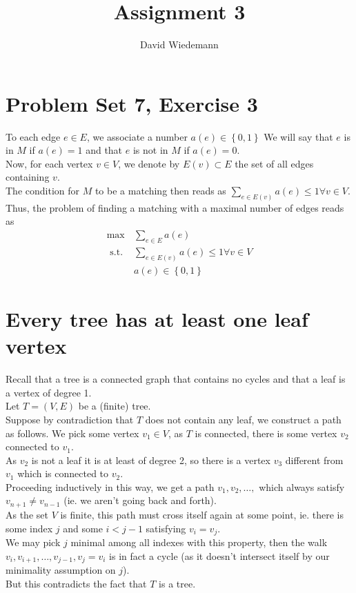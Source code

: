 \documentclass[11pt, a4paper]{article}
\begin{document}
\title{Assignment 3}
\author{David Wiedemann}
\maketitle
\section{Problem Set 7, Exercise 3}
To each edge $e\in E$, we associate a number $a( e ) \in \left\{ 0,1 \right\}  $ 
We will say that $e$ is in $M$ if $a( e ) =1$ and that $e$ is not in $M$ if $a( e  ) =0$.\\
Now, for each vertex $v\in V$, we denote by $E( v) \subset E$ the set of all edges containing $v$.\\
The condition for $M$ to be a matching then reads as $\sum_{ e \in E( v) } a( e )  \leq 1\forall  v \in V$.\\
Thus, the problem of finding a matching with a maximal number of edges reads as
\begin{align*}
	\max & \sum_{ e \in E} a( e  ) \\
	\text{ s.t. } & \sum_{e \in E( v) } a( e ) \leq 1\forall v \in V\\
		      &a( e  ) \in \left\{ 0,1 \right\} 
\end{align*}
\section{Every tree has at least one leaf vertex}
Recall that a tree is a connected graph that contains no cycles and that a leaf is a vertex of degree 1.\\
Let $T= ( V,E) $ be a (finite) tree.\\
Suppose by contradiction that $T$ does not contain any leaf, we construct a path as follows.
We pick some vertex $ v_1\in V$, as $T$ is connected, there is some vertex $v_2$ connected to $v_1$.\\
As $v_2$ is not a leaf it is at least of degree 2, so there is a vertex $v_3$ different from $v_1$ which is connected to $v_2$.\\
Proceeding inductively in this way, we get a path $v_1, v_2,\ldots, $ which always satisfy $v_{n+1} \neq v_{n-1} $ (ie. we aren't going back and forth).\\
As the set $V$ is finite, this path must cross itself again at some point, ie. there is some index $j$ and some $i< j-1$ satisfying $v_i = v_j$.\\
We may pick $j$ minimal among all indexes with this property, then the walk $v_i, v_{i+1} , \ldots, v_{j-1} , v_j =v_i$ is in fact a cycle (as it doesn't intersect itself by our minimality assumption on $j$).\\
But this contradicts the fact that $T$ is a tree.
\end{document}
